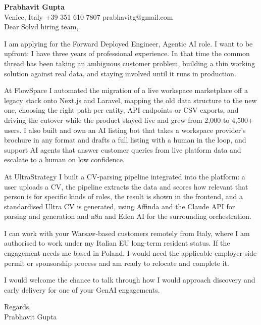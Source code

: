 \documentclass[a4paper,10.5pt]{article}
\begin{document}
\textbf{Prabhavit Gupta}\\
Venice, Italy \textbar{} +39 351 610 7807 \textbar{} prabhavitg@gmail.com\\[10pt]
Dear Solvd hiring team,

I am applying for the Forward Deployed Engineer, Agentic AI role. I want to be upfront: I have three years of professional experience. In that time the common thread has been taking an ambiguous customer problem, building a thin working solution against real data, and staying involved until it runs in production.

At FlowSpace I automated the migration of a live workspace marketplace off a legacy stack onto Next.js and Laravel, mapping the old data structure to the new one, choosing the right path per entity, API endpoints or CSV exports, and driving the cutover while the product stayed live and grew from 2,000 to 4,500+ users. I also built and own an AI listing bot that takes a workspace provider's brochure in any format and drafts a full listing with a human in the loop, and support AI agents that answer customer queries from live platform data and escalate to a human on low confidence.

At UltraStrategy I built a CV-parsing pipeline integrated into the platform: a user uploads a CV, the pipeline extracts the data and scores how relevant that person is for specific kinds of roles, the result is shown in the frontend, and a standardised Ultra CV is generated, using Affinda and the Claude API for parsing and generation and n8n and Eden AI for the surrounding orchestration.

I can work with your Warsaw-based customers remotely from Italy, where I am authorised to work under my Italian EU long-term resident status. If the engagement needs me based in Poland, I would need the applicable employer-side permit or sponsorship process and am ready to relocate and complete it.

I would welcome the chance to talk through how I would approach discovery and early delivery for one of your GenAI engagements.

Regards,\\
Prabhavit Gupta
\end{document}
